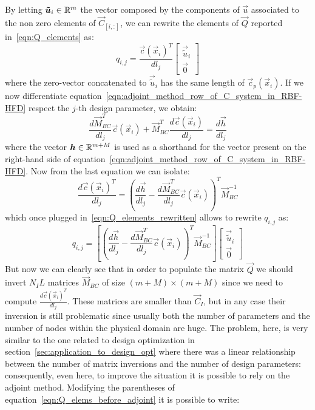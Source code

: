 By letting $\boldsymbol{\tilde{u}}_i \in \mathbb{R}^m$ the vector composed by the components of $\vec{u}$ associated to the non zero elements of $\vec{C}_{[i,:]}$, we can rewrite the elements of $\vec{Q}$ reported in~\eqref{eqn:Q_elements} as:
\begin{equation}
	\label{eqn:Q_elements_rewritten}
	q_{i,j} =
	\frac{\vec{c}(\vec{x}_i)^T}{dl_j}
	\begin{bmatrix}
		\vec{\tilde{u}}_i  \\
		\vec{0}
	\end{bmatrix}
\end{equation}
where the zero-vector concatenated to $\vec{\tilde{u}}_i$ has the same length of $\vec{c}_p(\vec{x}_i)$.
If we now differentiate equation~\eqref{eqn:adjoint_method_row_of_C_system_in_RBF-HFD} respect the $j$-th design parameter, we obtain:
\begin{equation}
	\frac{d \vec{M}_{BC}^T}{d l_j} \vec{c}(\vec{x}_i) + \vec{M}_{BC}^T \frac{d \vec{c}(\vec{x}_i)}{d l_j} = \frac{d \vec{h}}{d l_j}
\end{equation}
where the vector $\boldsymbol{h} \in \mathbb{R}^{m+M}$ is used as a shorthand for the vector present on the right-hand side of equation~\eqref{eqn:adjoint_method_row_of_C_system_in_RBF-HFD}. Now from the last equation we can isolate:
\begin{equation}
	\frac{d \vec{c}(\vec{x}_i)^T}{dl_j} = \left( \frac{d \vec{h}}{d l_j} - \frac{d \vec{M}_{BC}^T}{d l_j} \vec{c}(\vec{x}_i) \right)^T \vec{M}_{BC}^{-1}
\end{equation}
which once plugged in~\eqref{eqn:Q_elements_rewritten} allows to rewrite $q_{i,j}$ as:
\begin{equation}
	\label{eqn:Q_elems_before_adjoint}
	q_{i,j} =
	\left[ \left( \frac{d \vec{h}}{d l_j} - \frac{d \vec{M}_{BC}^T}{d l_j} \vec{c}(\vec{x}_i) \right)^T \vec{M}_{BC}^{-1} \right]
	\begin{bmatrix}
		\vec{\tilde{u}}_i  \\
		\vec{0}
	\end{bmatrix}
\end{equation}
But now we can clearly see that in order to populate the matrix $\vec{Q}$ we should invert $N_IL$ matrices $\vec{M}_{BC}$ of size $(m+M) \times (m+M)$ since we need to compute $\frac{d \vec{c}(\vec{x}_i)^T}{dl_j}$. These matrices are smaller than $\vec{C}_I$, but in any case their inversion is still problematic since usually both the number of parameters and the number of nodes within the physical domain are huge. The problem, here, is very similar to the one related to design optimization in section~\vref{sec:application_to_design_opt} where there was a linear relationship between the number of matrix inversions and the number of design parameters: consequently, even here, to improve the situation it is possible to rely on the adjoint method. Modifying the parentheses of equation~\eqref{eqn:Q_elems_before_adjoint} it is possible to write:
